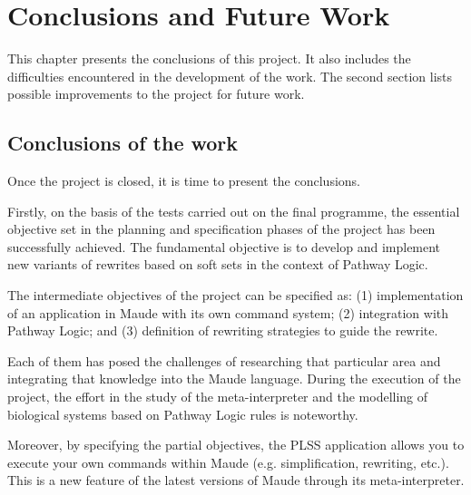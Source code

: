 
\chapter{Conclusions and Future Work}
\label{cap:conclusions}



This chapter presents the conclusions of this project. It also includes the difficulties encountered in the development of the work. The second section lists possible improvements to the project for future work.


\section{Conclusions of the work}

Once the project is closed, it is time to present the conclusions.

Firstly, on the basis of the tests carried out on the final programme, the essential objective set in the planning and specification phases of the project has been successfully achieved.
The fundamental objective is to develop and implement new variants of rewrites based on soft sets in the context of Pathway Logic.
\smallskip

The intermediate objectives of the project can be specified as:
(1) implementation of an application in Maude with its own command system; 
(2) integration with Pathway Logic; and
(3) definition of rewriting strategies to guide the rewrite.

Each of them has posed the challenges of researching that particular area and integrating that knowledge into the Maude language.
During the execution of the project, the effort in the study of the meta-interpreter and the modelling of biological systems based on Pathway Logic rules is noteworthy.
\smallskip

Moreover, by specifying the partial objectives, the PLSS application allows you to execute your own commands within Maude (e.g. simplification, rewriting, etc.). This is a new feature of the latest versions of Maude through its meta-interpreter.

